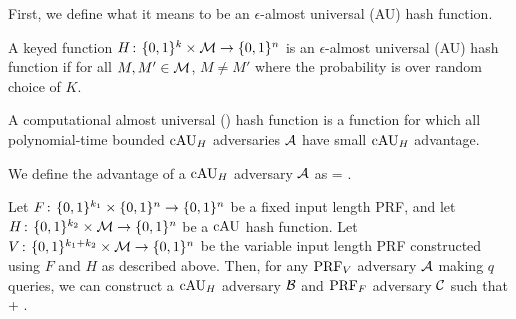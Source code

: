 First, we define what it means to be an $\epsilon$-almost universal (AU) hash function.

A keyed function $H{{\kern .05em}\colon{\kern .05em}}\{0,1\}^k\times{\cal M}\rightarrow\{0,1\}^n$ is
an $\epsilon$-almost universal (AU) hash function  if for all $M,M'\in{\cal M}$, $M \ne M'$
\bnm
   \le \epsilon
\enm
where the probability is over random choice of $K$.

A computational almost universal (\cAU) hash function is a function for which all polynomial-time bounded $\textnormal{cAU}_H$ adversaries ${\mathcal A}$ have small $\textnormal{cAU}_H$ advantage.
\begin{figure}[h]
\centering
{}
\end{figure}

We define the advantage of a $\textnormal{cAU}_H$ adversary ${\mathcal A}$ as
\bnm
   = \;.
\enm

\begin{figure}[h]
	\centering
\end{figure}
\begin{theorem} \label{thm:cau-vil-prf}
Let $F{{\kern .05em}\colon{\kern .05em}}\{0,1\}^{k_1}\times \{0,1\}^n\rightarrow \{0,1\}^n$ be a fixed input length PRF, and let $H{{\kern .05em}\colon{\kern .05em}} \{0,1\}^{k_2}\times {\cal M}\rightarrow \{0,1\}^n$ be a $\textnormal{cAU}$ hash function. Let $V{{\kern .05em}\colon{\kern .05em}} \{0,1\}^{k_1+k_2}\times {\cal M} \rightarrow \{0,1\}^n$ be the variable input length PRF constructed using $F$ and $H$ as described above. Then, for any $\textnormal{PRF}_V$ adversary ${\mathcal A}$ making $q$ queries, we can construct a $\textnormal{cAU}_H$ adversary ${\mathcal B}$ and $\textnormal{PRF}_F$ adversary ${\mathcal C}$ such that 
\bnm
	 \le {} + \;.
\enm
{}
\end{theorem}

